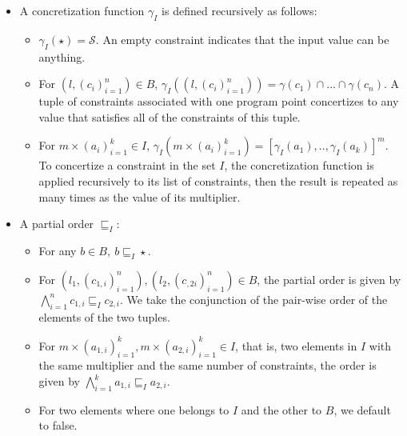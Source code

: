\documentclass[]{report}
\begin{document}
\begin{itemize}
	\item A concretization function $ \gamma_{I} $ is defined recursively as follows:
		\begin{itemize}
			\item $ \gamma_{I}(\star) = \mathcal{S}$. An empty constraint indicates that the input value can be anything. 
			
			\item For $ (l, (c_{i})_{i=1}^{n}) \in B $, $ \gamma_{I}((l, (c_{i})_{i=1}^{n})) = \gamma(c_{1}) \cap ... \cap\gamma(c_{n}) $. A tuple of constraints associated with one program point concertizes to any value that satisfies all of the constraints of this tuple.  
			
			\item For $ m \times (a_{i})_{i=1}^{k} \in I $, $ \gamma_{I}(m \times (a_{i})_{i=1}^{k}) = [\gamma_{I}(a_{1}),.., \gamma_{I}(a_{k})]^{m}$. To concertize a constraint in the set $ I $, the concretization function is applied recursively to its list of constraints, then the result is repeated as many times as the value of its multiplier. 
		\end{itemize}
	\item A partial order $ \sqsubseteq_{I} $:
	\begin{itemize}
		\item For any $ b \in B,\ b \sqsubseteq_{I} \star$. 
		\item For $(l_{1}, (c_{1,i})_{i=1}^{n}), (l_{2}, (c_{,2i})_{i=1}^{n}) \in B$, the partial order is given by $ \bigwedge\limits_{i=1}^{n} c_{1,i} \sqsubseteq_{I} c_{2,i} $. We take the conjunction of the pair-wise order of the elements of the two tuples. 
		\item For $ m \times (a_{1,i})_{i=1}^{k}, m \times (a_{2,i})_{i=1}^{k}  \in I$, that is, two elements in $ I $ with the same multiplier and the same number of constraints, the order is given by $ \bigwedge\limits_{i=1}^{k}a_{1,i} \sqsubseteq_{I} a_{2,i} $. 
		\item For two elements where one belongs to $ I $ and the other to $ B $, we default to false. 
	\end{itemize}
	

\end{itemize}
\end{document}
